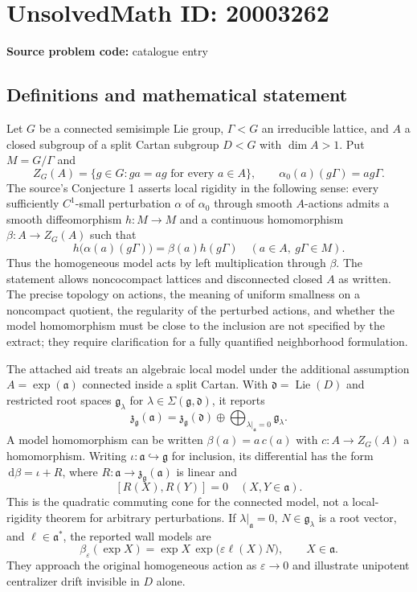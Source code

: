 \documentclass[11pt]{article}
\newcommand{\dd}{\,\mathrm{d}}
\begin{document}
\section*{UnsolvedMath ID: 20003262}
\textbf{Source problem code:} catalogue entry
\subsection{Definitions and mathematical statement}
Let $G$ be a connected semisimple Lie group, $\Gamma<G$ an irreducible lattice, and $A$ a closed subgroup of a split Cartan subgroup $D<G$ with $\dim A>1$. Put $M=G/\Gamma$ and
\[
 Z_G(A)=\{g\in G:ga=ag\text{ for every }a\in A\},\qquad
 \alpha_0(a)(g\Gamma)=ag\Gamma.
\]
The source's Conjecture 1 asserts local rigidity in the following sense: every sufficiently $C^1$-small perturbation $\alpha$ of $\alpha_0$ through smooth $A$-actions admits a smooth diffeomorphism $h:M\to M$ and a continuous homomorphism $\beta:A\to Z_G(A)$ such that
\[
 h\bigl(\alpha(a)(g\Gamma)\bigr)=\beta(a)h(g\Gamma)
 \quad(a\in A,\ g\Gamma\in M).
\]
Thus the homogeneous model acts by left multiplication through $\beta$. The statement allows noncocompact lattices and disconnected closed $A$ as written. The precise topology on actions, the meaning of uniform smallness on a noncompact quotient, the regularity of the perturbed actions, and whether the model homomorphism must be close to the inclusion are not specified by the extract; they require clarification for a fully quantified neighborhood formulation.

The attached aid treats an algebraic local model under the additional assumption $A=\exp(\mathfrak a)$ connected inside a split Cartan. With $\mathfrak d=\operatorname{Lie}(D)$ and restricted root spaces $\mathfrak g_\lambda$ for $\lambda\in\Sigma(\mathfrak g,\mathfrak d)$, it reports
\[
 \mathfrak z_{\mathfrak g}(\mathfrak a)=
 \mathfrak z_{\mathfrak g}(\mathfrak d)\oplus
 \bigoplus_{\lambda|_{\mathfrak a}=0}\mathfrak g_\lambda.
\]
A model homomorphism can be written $\beta(a)=a\,c(a)$ with $c:A\to Z_G(A)$ a homomorphism. Writing $\iota:\mathfrak a\hookrightarrow\mathfrak g$ for inclusion, its differential has the form $\dd\beta=\iota+R$, where $R:\mathfrak a\to\mathfrak z_{\mathfrak g}(\mathfrak a)$ is linear and
\[
 [R(X),R(Y)]=0\quad(X,Y\in\mathfrak a).
\]
This is the quadratic commuting cone for the connected model, not a local-rigidity theorem for arbitrary perturbations. If $\lambda|_{\mathfrak a}=0$, $N\in\mathfrak g_\lambda$ is a root vector, and $\ell\in\mathfrak a^*$, the reported wall models are
\[
 \beta_\varepsilon(\exp X)=\exp X\,\exp\bigl(\varepsilon\ell(X)N\bigr),
 \qquad X\in\mathfrak a.
\]
They approach the original homogeneous action as $\varepsilon\to0$ and illustrate unipotent centralizer drift invisible in $D$ alone.
\end{document}
